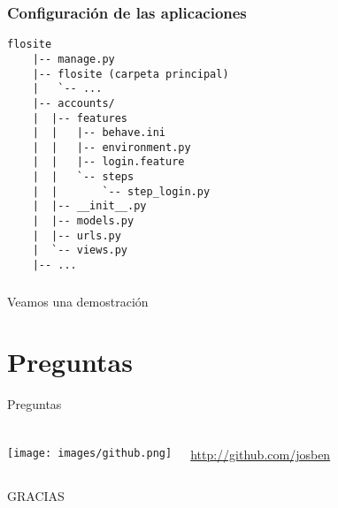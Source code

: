 \documentclass{beamer}
\begin{document}
\begin{frame}[fragile]
  \frametitle{Configuraci\'on de las aplicaciones}
  \begin{verbatim}
flosite
    |-- manage.py
    |-- flosite (carpeta principal)
    |   `-- ...
    |-- accounts/
    |  |-- features
    |  |   |-- behave.ini
    |  |   |-- environment.py
    |  |   |-- login.feature
    |  |   `-- steps
    |  |       `-- step_login.py
    |  |-- __init__.py
    |  |-- models.py
    |  |-- urls.py
    |  `-- views.py
    |-- ...

  \end{verbatim}
\end{frame}

\begin{frame}
  \frametitle{}
  \begin{center}
    Veamos una demostraci\'on
  \end{center}
\end{frame}

\begin{frame}
  \frametitle{}
  \section{Preguntas}
  \begin{center}
    Preguntas
  \end{center}
\end{frame}

\begin{frame}
  \frametitle{}
  \begin{center}
  \begin{columns}
      \texttt{[image: images/github.png]}

      \url {http://github.com/josben}
  \end{columns}

    {\huge GRACIAS}
  \end{center}
\end{frame}
\end{document}
